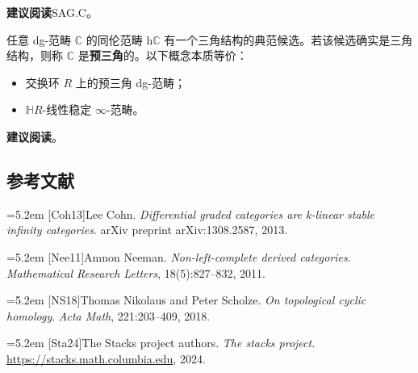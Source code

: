 \nitem\label{L17-A.4} \textbf{建议阅读}\quad SAG.C。


\nitem\label{L17-B.1} 任意 dg-范畴 $\mathbb{C}$ 的同伦范畴 $\mathrm{h}\mathbb{C}$ 有一个三角结构的典范候选。若该候选确实是三角结构，则称 $\mathbb{C}$ 是\textbf{预三角}的。以下概念本质等价：
\begin{itemize}[leftmargin=2.2em,itemsep=0.1em]
\item 交换环 $R$ 上的预三角 dg-范畴；
\item $\mathbb{H}R$-线性稳定 $\infty$-范畴。
\end{itemize}

\nitem\label{L17-B.2} \textbf{建议阅读}\quad [Coh13]。

\subsection*{参考文献}
\par\noindent\hangindent=5.2em [Coh13]\hspace{0.6em}Lee Cohn. \emph{Differential graded categories are k-linear stable infinity categories}. arXiv preprint arXiv:1308.2587, 2013.
\par\noindent\hangindent=5.2em [Nee11]\hspace{0.6em}Amnon Neeman. \emph{Non-left-complete derived categories}. \emph{Mathematical Research Letters}, 18(5):827--832, 2011.
\par\noindent\hangindent=5.2em [NS18]\hspace{0.6em}Thomas Nikolaus and Peter Scholze. \emph{On topological cyclic homology}. \emph{Acta Math}, 221:203--409, 2018.
\par\noindent\hangindent=5.2em [Sta24]\hspace{0.6em}The Stacks project authors. \emph{The stacks project}. \url{https://stacks.math.columbia.edu}, 2024.
